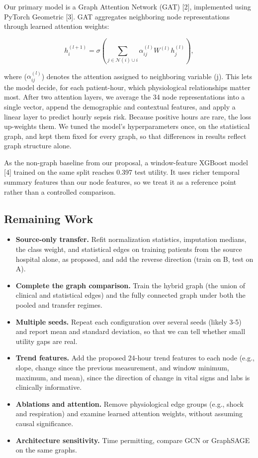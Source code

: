\documentclass{article}
\begin{document}
Our primary model is a Graph Attention Network (GAT) [2], implemented using PyTorch Geometric [3]. GAT aggregates neighboring node representations through learned attention weights:

\[
h_i^{(l+1)}=\sigma\left(\sum_{j\in\mathcal{N}(i)\cup{i}}\alpha_{ij}^{(l)}W^{(l)}h_j^{(l)}\right),
\]

where ($\alpha_{ij}^{(l)}$) denotes the attention assigned to neighboring variable (j). This lets the model decide, for each patient-hour, which physiological relationships matter most. After two attention layers, we average the 34 node representations into a single vector, append the demographic and contextual features, and apply a linear layer to predict hourly sepsis risk. Because positive hours are rare, the loss up-weights them. We tuned the model’s hyperparameters once, on the statistical graph, and kept them fixed for every graph, so that differences in results reflect graph structure alone.

As the non-graph baseline from our proposal, a window-feature XGBoost model [4] trained on the same split reaches 0.397 test utility. It uses richer temporal summary features than our node features, so we treat it as a reference point rather than a controlled comparison.

\subsection{Remaining Work} 
\begin{itemize}
    \item \textbf{Source-only transfer.} Refit normalization statistics, imputation medians, the class weight, and statistical edges on training patients from the source hospital alone, as proposed, and add the reverse direction (train on B, test on A).
    \item \textbf{Complete the graph comparison.} Train the hybrid graph (the union of clinical and statistical edges) and the fully connected graph under both the pooled and transfer regimes.
    \item \textbf{Multiple seeds.} Repeat each configuration over several seeds (likely 3-5) and report mean and standard deviation, so that we can tell whether small utility gaps are real.
    \item \textbf{Trend features.} Add the proposed 24-hour trend features to each node (e.g., slope, change since the previous measurement, and window minimum, maximum, and mean), since the direction of change in vital signs and labs is clinically informative.
    \item \textbf{Ablations and attention.} Remove physiological edge groups (e.g., shock and respiration) and examine learned attention weights, without assuming causal significance.
    \item \textbf{Architecture sensitivity.} Time permitting, compare GCN or GraphSAGE on the same graphs.
\end{itemize}
\end{document}
